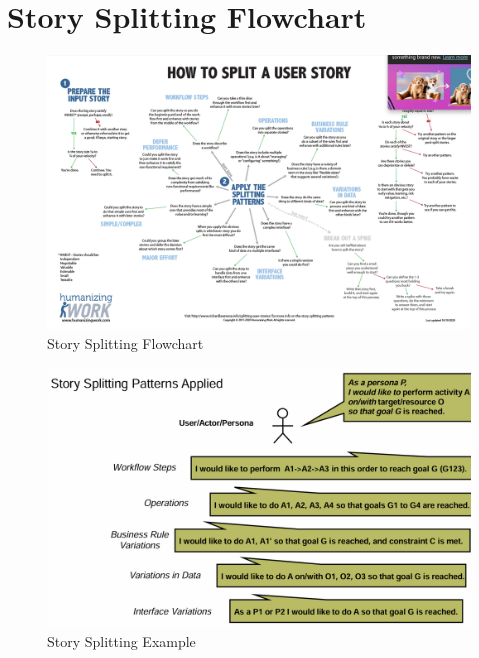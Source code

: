 \documentclass[../Main.tex]{subfiles}
\begin{document}
\section{Story Splitting Flowchart}
\begin{figure}[H]
    \centering
    \includegraphics[angle=90,height=1\textwidth]{Images/storysplitting.png}
    \caption{Story Splitting Flowchart}
    \label{fig:storysplit}
\end{figure}
\newpage
\begin{figure}[H]
    \centering
    \includegraphics{Images/appliedstorysplitting.png}
    \caption{Story Splitting Example}
    \label{fig:storyplitex}
\end{figure}
\end{document}
